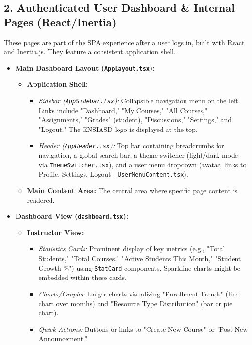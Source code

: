 \subsection*{2. Authenticated User Dashboard \& Internal Pages (React/Inertia)}

These pages are part of the SPA experience after a user logs in, built with React and Inertia.js. They feature a consistent application shell.

\begin{itemize}
    \item \textbf{Main Dashboard Layout (\texttt{AppLayout.tsx}):}
    \begin{itemize}
        \item \textbf{Application Shell:}
        \begin{itemize}
            \item \textit{Sidebar (\texttt{AppSidebar.tsx}):} Collapsible navigation menu on the left. Links include "Dashboard," "My Courses," "All Courses," "Assignments," "Grades" (student), "Discussions," "Settings," and "Logout." The ENSIASD logo is displayed at the top.
            \item \textit{Header (\texttt{AppHeader.tsx}):} Top bar containing breadcrumbs for navigation, a global search bar, a theme switcher (light/dark mode via \texttt{ThemeSwitcher.tsx}), and a user menu dropdown (avatar, links to Profile, Settings, Logout - \texttt{UserMenuContent.tsx}).
        \end{itemize}
        \item \textbf{Main Content Area:} The central area where specific page content is rendered.
    \end{itemize}
    \item \textbf{Dashboard View (\texttt{dashboard.tsx}):}
    \begin{itemize}
        \item \textbf{Instructor View:}
        \begin{itemize}
            \item \textit{Statistics Cards:} Prominent display of key metrics (e.g., "Total Students," "Total Courses," "Active Students This Month," "Student Growth \%") using \texttt{StatCard} components. Sparkline charts might be embedded within these cards.
            \item \textit{Charts/Graphs:} Larger charts visualizing "Enrollment Trends" (line chart over months) and "Resource Type Distribution" (bar or pie chart).
            \item \textit{Quick Actions:} Buttons or links to "Create New Course" or "Post New Announcement."

\end{itemize}
\end{itemize}
\end{itemize}
